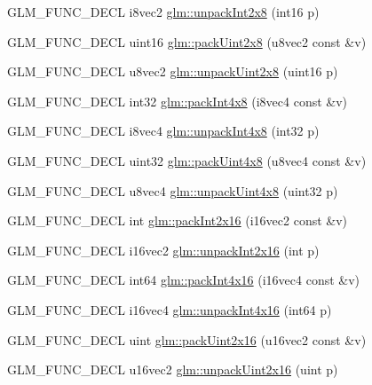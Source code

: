 \begin{DoxyCompactItemize}
\item 
G\+L\+M\+\_\+\+F\+U\+N\+C\+\_\+\+D\+E\+CL i8vec2 \hyperlink{group__gtc__packing_ga55b4670bffab6ddb39d4a0fbf98718c1}{glm\+::unpack\+Int2x8} (int16 p)
\item 
G\+L\+M\+\_\+\+F\+U\+N\+C\+\_\+\+D\+E\+CL uint16 \hyperlink{group__gtc__packing_ga4a431a30aa5dfb425be3ea84fe561844}{glm\+::pack\+Uint2x8} (u8vec2 const \&v)
\item 
G\+L\+M\+\_\+\+F\+U\+N\+C\+\_\+\+D\+E\+CL u8vec2 \hyperlink{group__gtc__packing_ga060e0e7e299aa73ff869c197ebf44210}{glm\+::unpack\+Uint2x8} (uint16 p)
\item 
G\+L\+M\+\_\+\+F\+U\+N\+C\+\_\+\+D\+E\+CL int32 \hyperlink{group__gtc__packing_gac04277b39f9ca1ae2ca4840a3cb987e8}{glm\+::pack\+Int4x8} (i8vec4 const \&v)
\item 
G\+L\+M\+\_\+\+F\+U\+N\+C\+\_\+\+D\+E\+CL i8vec4 \hyperlink{group__gtc__packing_gaeed27076c5d26f4cca0d06637d3e878c}{glm\+::unpack\+Int4x8} (int32 p)
\item 
G\+L\+M\+\_\+\+F\+U\+N\+C\+\_\+\+D\+E\+CL uint32 \hyperlink{group__gtc__packing_gaeb4262f799821affa62edf7067deaef9}{glm\+::pack\+Uint4x8} (u8vec4 const \&v)
\item 
G\+L\+M\+\_\+\+F\+U\+N\+C\+\_\+\+D\+E\+CL u8vec4 \hyperlink{group__gtc__packing_ga99229dc6cb31d82c39a324d5753792c6}{glm\+::unpack\+Uint4x8} (uint32 p)
\item 
G\+L\+M\+\_\+\+F\+U\+N\+C\+\_\+\+D\+E\+CL int \hyperlink{group__gtc__packing_ga0182984c14b2b59fd74e72af3f3b4bb9}{glm\+::pack\+Int2x16} (i16vec2 const \&v)
\item 
G\+L\+M\+\_\+\+F\+U\+N\+C\+\_\+\+D\+E\+CL i16vec2 \hyperlink{group__gtc__packing_ga639c216b452fc364b32c15eb5b8b6a87}{glm\+::unpack\+Int2x16} (int p)
\item 
G\+L\+M\+\_\+\+F\+U\+N\+C\+\_\+\+D\+E\+CL int64 \hyperlink{group__gtc__packing_gac3ef78d62735b5c34503c33e37e401c2}{glm\+::pack\+Int4x16} (i16vec4 const \&v)
\item 
G\+L\+M\+\_\+\+F\+U\+N\+C\+\_\+\+D\+E\+CL i16vec4 \hyperlink{group__gtc__packing_ga625619888b95299a1ee0d9e50469c482}{glm\+::unpack\+Int4x16} (int64 p)
\item 
G\+L\+M\+\_\+\+F\+U\+N\+C\+\_\+\+D\+E\+CL uint \hyperlink{group__gtc__packing_gad5ca2e64edae3c233657c9fb0d18a9c9}{glm\+::pack\+Uint2x16} (u16vec2 const \&v)
\item 
G\+L\+M\+\_\+\+F\+U\+N\+C\+\_\+\+D\+E\+CL u16vec2 \hyperlink{group__gtc__packing_ga7778efa924e6efc386cb9f373bb06b72}{glm\+::unpack\+Uint2x16} (uint p)

\end{DoxyCompactItemize}
